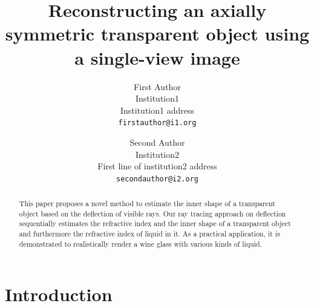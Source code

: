 \documentclass[10pt,twocolumn,letterpaper]{article}
\begin{document}
\title{Reconstructing an axially symmetric transparent object using a single-view image}

\author{First Author\\
Institution1\\
Institution1 address\\
{\tt\small firstauthor@i1.org}
\and
Second Author\\
Institution2\\
First line of institution2 address\\
{\tt\small secondauthor@i2.org}
}

\maketitle

\begin{abstract}
   This paper proposes a novel method to estimate the inner shape of a transparent object based on the deflection of visible rays. Our ray tracing approach on deflection sequentially estimates the refractive index and the inner shape of a transparent object and furthermore the refractive index of liquid in it. As a practical application, it is demonstrated to realistically render a wine glass with various kinds of liquid.
\end{abstract}

\section{Introduction}
\end{document}
